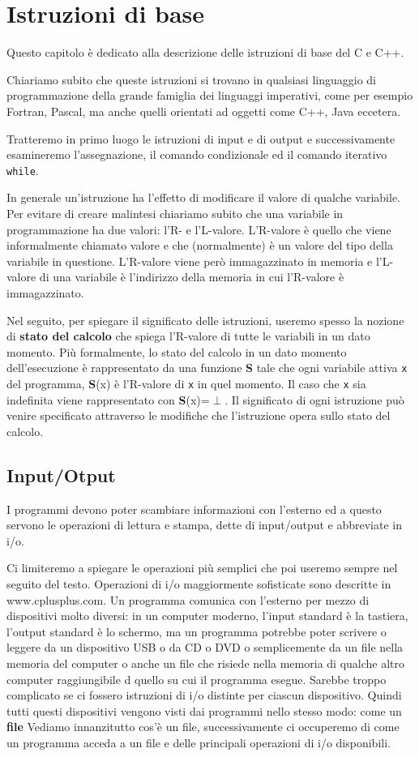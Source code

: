 \chapter{Istruzioni di base}
Questo capitolo è dedicato alla descrizione delle istruzioni di base del C e C++.

\noindent Chiariamo subito che queste istruzioni si trovano in qualsiasi linguaggio di programmazione della grande famiglia dei linguaggi imperativi, come per esempio Fortran, Pascal, ma anche quelli orientati ad oggetti come C++, Java eccetera.

\noindent Tratteremo in primo luogo le istruzioni di input e di output e successivamente esamineremo l'assegnazione, il comando condizionale ed il comando iterativo \texttt{while}.

In generale un'istruzione ha l'effetto di modificare il valore di qualche variabile.
Per evitare di creare malintesi chiariamo subito che una variabile in programmazione ha due valori: l'R- e l'L-valore.
L'R-valore è quello che viene informalmente chiamato valore e che (normalmente) è un valore del tipo della variabile in questione.
L'R-valore viene però immagazzinato in memoria e l'L-valore di una variabile è l'indirizzo della memoria in cui l'R-valore è immagazzinato.

Nel seguito, per spiegare il significato delle istruzioni, useremo spesso la nozione di \textbf{stato del calcolo} che spiega l'R-valore di tutte le variabili in un dato momento.
Più formalmente, lo stato del calcolo in un dato momento dell'esecuzione è rappresentato da una funzione \textbf{S} tale che ogni variabile attiva \texttt{x} del programma, \textbf{S}(x) è l'R-valore di \texttt{x} in quel momento.
Il caso che \texttt{x} sia indefinita viene rappresentato con \textbf{S}(x)=$\perp$.
Il significato di ogni istruzione può venire specificato attraverso le modifiche che l'istruzione opera sullo stato del calcolo.

\section{Input/Otput}
I programmi devono poter scambiare informazioni con l'esterno ed a questo servono le operazioni di lettura e stampa, dette di input/output e abbreviate in i/o.

\noindent Ci limiteremo a spiegare le operazioni più semplici che poi useremo sempre nel seguito del testo.
Operazioni di i/o maggiormente sofisticate sono descritte in www.cplusplus.com.
Un programma comunica con l'esterno per mezzo di dispositivi molto diversi: in un computer moderno, l'input standard è la tastiera, l'output standard è lo schermo, ma un programma potrebbe poter scrivere o leggere da un dispositivo USB o da CD o DVD o semplicemente da un file nella memoria del computer o anche un file che risiede nella memoria di qualche altro computer raggiungibile d quello su cui il programma esegue.
Sarebbe troppo complicato se ci fossero istruzioni di i/o distinte per ciascun dispositivo.
Quindi tutti questi dispositivi vengono visti dai programmi nello stesso modo: come un \textbf{file}
Vediamo innanzitutto cos'è un file, successivamente ci occuperemo di come un programma acceda a un file e delle principali operazioni di i/o disponibili.

